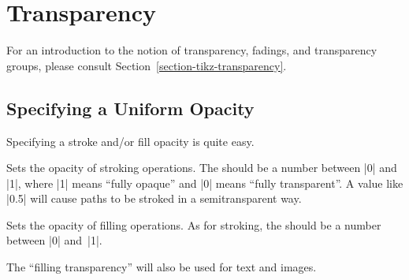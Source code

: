 %
%
%


\section[Base Layer Transparency]{Transparency}
\label{section-transparency}

For an introduction to the notion of transparency, fadings, and transparency
groups, please consult Section~\ref{section-tikz-transparency}.


\subsection{Specifying a Uniform Opacity}

Specifying a stroke and/or fill opacity is quite easy.

\begin{command}{\pgfsetstrokeopacity{}}
    Sets the opacity of stroking operations. The  should be a
    number between |0| and |1|, where |1| means ``fully opaque'' and |0| means
    ``fully transparent''. A value like |0.5| will cause paths to be stroked in
    a semitransparent way.
\begin{codeexample}[]
\begin{pgfpicture}
  \pgfsetlinewidth{5mm}
  \color{red}
  \pgfpathcircle{\pgfpoint{0cm}{0cm}}{10mm} 
  \color{black}
  \pgfpathcircle{\pgfpoint{1cm}{0cm}}{10mm} 
\end{pgfpicture}
\end{codeexample}
\end{command}

\begin{command}{\pgfsetfillopacity{}}
    Sets the opacity of filling operations. As for stroking, the 
    should be a number between |0| and~|1|.

    The ``filling transparency'' will also be used for text and images.
\begin{codeexample}[]
\end{codeexample}
\end{command}

